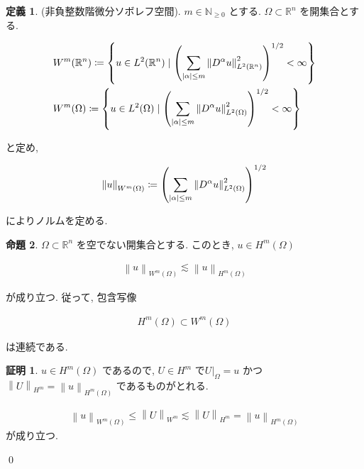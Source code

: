 \documentclass[10pt, fleqn, label-section=none]{bxjsarticle}
\theoremstyle{definition}
\newtheorem{dfn}{定義}[section]
\newtheorem{prop}[dfn]{命題}
\newtheorem*{pf*}{証明}
\newcommand{\paren}[1]{\mleft( #1\mright )}
\newcommand{\cbra}[1]{\mleft\{#1\mright\}}
\newcommand{\abs}[1]{\left|#1\right|}
\newcommand{\norm}[1]{\left\|#1\right\|}
\renewcommand{\;}{\, ; \,}
\begin{document}
\begin{dfn}(非負整数階微分ソボレフ空間). $m \in \mathbb N_{\geq 0}$ とする. $\Omega \subset \mathbb R^n$ を開集合とする. 

\begin{align*} & W^m(\mathbb R^n) \coloneqq \cbra{u \in L^2(\mathbb R^n) \mid \paren{ \sum_{\abs{\alpha} \leq m } \norm{ D^\alpha u}_{L^2(\mathbb R^n)} ^2 }^{1/2} < \infty  } 
\\ & W^m(\Omega ) \coloneqq \cbra{u \in L^2(\Omega ) \mid \paren{ \sum_{\abs{\alpha} \leq m } \norm{ D^\alpha u}_{L^2(\Omega )} ^2 }^{1/2} < \infty  } 
\end{align*}

と定め, 

\begin{align*} \norm{u}_{W^m(\Omega)}  \coloneqq \paren{ \sum_{\abs{\alpha} \leq m } \norm{ D^\alpha u}_{L^2(\Omega )} ^2 }^{1/2}       \end{align*}

によりノルムを定める.

\end{dfn}



\begin{prop}$\Omega \subset \mathbb R^n$ を空でない開集合とする. このとき, $u \in H^m(\Omega)$

\begin{align*} \norm{u}_{W^m(\Omega)} \lesssim \norm{u}_{H^m(\Omega)}\end{align*}

が成り立つ. 従って, 包含写像

\begin{align*} H^m(\Omega) \subset W^m(\Omega ) \end{align*}

は連続である. 

\end{prop}
\begin{pf*}

$u \in H^m(\Omega)$ であるので, $U \in H^m$ で$U|_{\Omega } = u$ かつ$\norm{U}_{H^m} = \norm{u}_{H^m(\Omega)}$ であるものがとれる. 

\begin{align*} \norm{u}_{W^m(\Omega)} \leq \norm{U}_{W^m} \lesssim \norm{U}_{H^m} = \norm{u}_{H^m(\Omega)} \end{align*} 
が成り立つ. 

\qed
\end{pf*}
\end{document}
